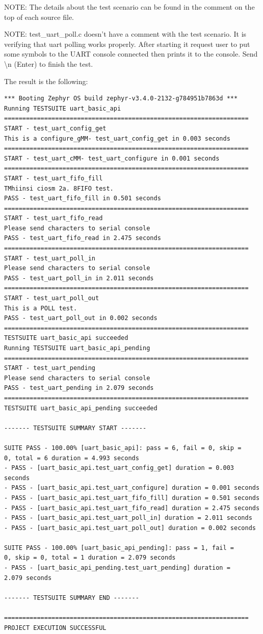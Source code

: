 \documentclass[11pt,a4paper,oneside]{article}
\begin{document}
NOTE: The details about the test scenario can be found in the comment on
the top of each source file.

NOTE: test\_uart\_poll.c doesn't have a comment with the test scenario.
It is verifying that uart polling works properly. After starting it
request user to put some symbols to the UART console connected then
prints it to the console. Send \textbackslash n (Enter) to finish the
test.

The result is the following:

\begin{lstlisting}
*** Booting Zephyr OS build zephyr-v3.4.0-2132-g784951b7863d ***
Running TESTSUITE uart_basic_api
===================================================================
START - test_uart_config_get
This is a configure_gMM- test_uart_config_get in 0.003 seconds
===================================================================
START - test_uart_cMM- test_uart_configure in 0.001 seconds
===================================================================
START - test_uart_fifo_fill
TMhiinsi ciosm 2a. 8FIFO test.
PASS - test_uart_fifo_fill in 0.501 seconds
===================================================================
START - test_uart_fifo_read
Please send characters to serial console
PASS - test_uart_fifo_read in 2.475 seconds
===================================================================
START - test_uart_poll_in
Please send characters to serial console
PASS - test_uart_poll_in in 2.011 seconds
===================================================================
START - test_uart_poll_out
This is a POLL test.
PASS - test_uart_poll_out in 0.002 seconds
===================================================================
TESTSUITE uart_basic_api succeeded
Running TESTSUITE uart_basic_api_pending
===================================================================
START - test_uart_pending
Please send characters to serial console
PASS - test_uart_pending in 2.079 seconds
===================================================================
TESTSUITE uart_basic_api_pending succeeded

------- TESTSUITE SUMMARY START -------

SUITE PASS - 100.00% [uart_basic_api]: pass = 6, fail = 0, skip =
0, total = 6 duration = 4.993 seconds
- PASS - [uart_basic_api.test_uart_config_get] duration = 0.003 seconds
- PASS - [uart_basic_api.test_uart_configure] duration = 0.001 seconds
- PASS - [uart_basic_api.test_uart_fifo_fill] duration = 0.501 seconds
- PASS - [uart_basic_api.test_uart_fifo_read] duration = 2.475 seconds
- PASS - [uart_basic_api.test_uart_poll_in] duration = 2.011 seconds
- PASS - [uart_basic_api.test_uart_poll_out] duration = 0.002 seconds

SUITE PASS - 100.00% [uart_basic_api_pending]: pass = 1, fail =
0, skip = 0, total = 1 duration = 2.079 seconds
- PASS - [uart_basic_api_pending.test_uart_pending] duration =
2.079 seconds

------- TESTSUITE SUMMARY END -------

===================================================================
PROJECT EXECUTION SUCCESSFUL
\end{lstlisting}
\end{document}
